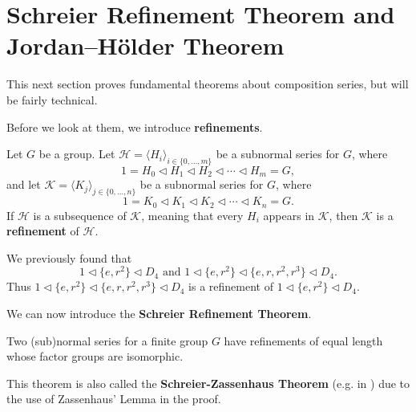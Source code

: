 \section{Schreier Refinement Theorem and Jordan–H\"older Theorem}
This next section proves fundamental theorems about composition series, but will be fairly technical.

Before we look at them, we introduce \textbf{refinements}.
\begin{definition}
    Let $G$ be a group. Let $\mathcal{H} = \langle H_i \rangle_{i\in\{0,\dots,m\}}$ be a subnormal series for $G$, where
    \[
        1 = H_0 \lhd H_1 \lhd H_2 \lhd \cdots \lhd H_m = G,
    \]
    and let $\mathcal{K} = \langle K_j \rangle_{j\in\{0,\dots,n\}}$ be a subnormal series for $G$, where
    \[
        1 = K_0 \lhd K_1 \lhd K_2 \lhd \cdots \lhd K_n = G.
    \]
    If $\mathcal{H}$ is a subsequence of $\mathcal{K}$, meaning that every $H_i$ appears in $\mathcal{K}$, then $\mathcal{K}$ is a \textbf{refinement} of $\mathcal{H}$.
\end{definition}
\begin{example}
    We previously found that
    \[
        1 \lhd \{e, r^2\} \lhd D_4 \text{ and } 1 \lhd \{e, r^2\} \lhd \{e, r, r^2, r^3\} \lhd D_4.    
    \]
    Thus $1 \lhd \{e, r^2\} \lhd \{e, r, r^2, r^3\} \lhd D_4$ is a refinement of $1 \lhd \{e, r^2\} \lhd D_4$.
\end{example}

We can now introduce the \textbf{Schreier Refinement Theorem}.
\begin{theorem}\label{thrm-schreier}
    Two (sub)normal series for a finite group $G$ have refinements of equal length whose factor groups are isomorphic.
\end{theorem}
\begin{remark}
    This theorem is also called the \textbf{Schreier-Zassenhaus Theorem} (e.g. in \cite{clark_1984}) due to the use of Zassenhaus' Lemma in the proof.
\end{remark}

